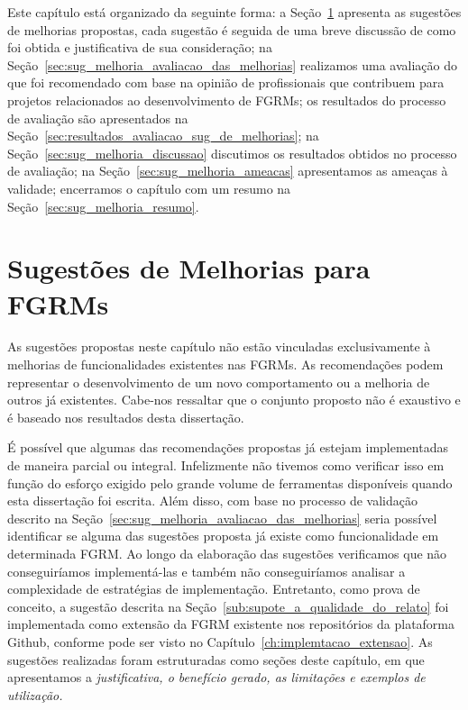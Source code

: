 Este capítulo está organizado da seguinte forma: a
Seção~\ref{sec:sug_melhoria_melhorando_as_ferraementas} apresenta as sugestões
de melhorias propostas, cada sugestão é seguida de uma breve discussão de como
foi obtida e justificativa de sua consideração; na
Seção~\ref{sec:sug_melhoria_avaliacao_das_melhorias} realizamos uma avaliação
do que foi recomendado com base na opinião de profissionais que contribuem para
projetos relacionados ao desenvolvimento de FGRMs; os resultados do processo de
avaliação são apresentados na
Seção~\ref{sec:resultados_avaliacao_sug_de_melhorias}; na
Seção~\ref{sec:sug_melhoria_discussao} discutimos os resultados obtidos no
processo de avaliação; na Seção~\ref{sec:sug_melhoria_ameacas} apresentamos as
ameaças à validade; encerramos o capítulo com um resumo na
Seção~\ref{sec:sug_melhoria_resumo}.

\section{Sugestões de Melhorias para FGRMs}\label{sec:sug_melhoria_melhorando_as_ferraementas}

As sugestões propostas neste capítulo não estão vinculadas exclusivamente à
melhorias de funcionalidades existentes nas FGRMs. As recomendações podem
representar o desenvolvimento de um novo comportamento ou a melhoria de outros
já existentes. Cabe-nos ressaltar que o conjunto proposto não é exaustivo e é
baseado nos resultados desta dissertação.

É possível que algumas das recomendações propostas já estejam implementadas de
maneira parcial ou integral. Infelizmente não tivemos como verificar isso em
função do esforço exigido pelo grande volume de ferramentas disponíveis quando
esta dissertação foi escrita. Além disso, com base no processo de validação
descrito na Seção~\ref{sec:sug_melhoria_avaliacao_das_melhorias} seria possível
identificar se alguma das sugestões proposta já existe como funcionalidade em
determinada FGRM. Ao longo da elaboração das sugestões verificamos que não
conseguiríamos implementá-las e também não conseguiríamos analisar a
complexidade de estratégias de implementação. Entretanto, como prova de
conceito, a sugestão descrita na Seção~\ref{sub:supote_a_qualidade_do_relato}
foi implementada como extensão da FGRM existente nos repositórios da plataforma
Github, conforme pode ser visto no Capítulo~\ref{ch:implemtacao_extensao}. As
sugestões realizadas foram estruturadas como seções deste capítulo, em que
apresentamos a \textit{justificativa, o benefício gerado, as limitações e
    exemplos de utilização.}

